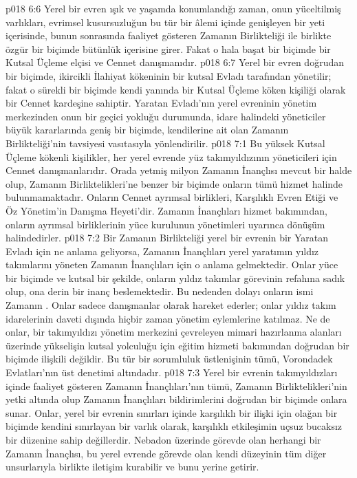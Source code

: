\vs p018 6:6 Yerel bir evren ışık ve yaşamda konumlandığı zaman, onun yüceltilmiş varlıkları, evrimsel kusursuzluğun bu tür bir âlemi içinde genişleyen bir yeti içerisinde, bunun sonrasında faaliyet gösteren Zamanın Birlikteliği ile birlikte özgür bir biçimde bütünlük içerisine girer. Fakat o hala başat bir biçimde bir Kutsal Üçleme elçisi ve Cennet danışmanıdır.
\vs p018 6:7 Yerel bir evren doğrudan bir biçimde, ikircikli İlahiyat kökeninin bir kutsal Evladı tarafından yönetilir; fakat o sürekli bir biçimde kendi yanında bir Kutsal Üçleme köken kişiliği olarak bir Cennet kardeşine sahiptir. Yaratan Evladı’nın yerel evreninin yönetim merkezinden onun bir geçici yokluğu durumunda, idare halindeki yöneticiler büyük kararlarında geniş bir biçimde, kendilerine ait olan Zamanın Birlikteliği’nin tavsiyesi vasıtasıyla yönlendirilir.
\vs p018 7:1 Bu yüksek Kutsal Üçleme kökenli kişilikler, her yerel evrende yüz takımyıldızının yöneticileri için Cennet danışmanlarıdır. Orada yetmiş milyon Zamanın İnançlısı mevcut bir halde olup, Zamanın Birliktelikleri’ne benzer bir biçimde onların tümü hizmet halinde bulunmamaktadır. Onların Cennet ayrımsal birlikleri, Karşılıklı Evren Etiği ve Öz Yönetim’in Danışma Heyeti’dir. Zamanın İnançlıları hizmet bakımından, onların ayrımsal birliklerinin yüce kurulunun yönetimleri uyarınca dönüşüm halindedirler.
\vs p018 7:2 Bir Zamanın Birlikteliği yerel bir evrenin bir Yaratan Evladı için ne anlama geliyorsa, Zamanın İnançlıları yerel yaratımın yıldız takımlarını yöneten Zamanın İnançlıları için o anlama gelmektedir. Onlar yüce bir biçimde ve kutsal bir şekilde, onların yıldız takımlar görevinin refahına sadık olup, ona derin bir inanç beslemektedir. Bu nedenden dolayı onların ismi Zamanın . Onlar sadece danışmanlar olarak hareket ederler; onlar yıldız takım idarelerinin daveti dışında hiçbir zaman yönetim eylemlerine katılmaz. Ne de onlar, bir takımyıldızı yönetim merkezini çevreleyen mimari hazırlanma alanları üzerinde yükselişin kutsal yolculuğu için eğitim hizmeti bakımından doğrudan bir biçimde ilişkili değildir. Bu tür bir sorumluluk üstlenişinin tümü, Vorondadek Evlatları’nın üst denetimi altındadır.
\vs p018 7:3 Yerel bir evrenin takımyıldızları içinde faaliyet gösteren Zamanın İnançlıları’nın tümü, Zamanın Birliktelikleri’nin yetki altında olup Zamanın İnançlıları bildirimlerini doğrudan bir biçimde onlara sunar. Onlar, yerel bir evrenin sınırları içinde karşılıklı bir ilişki için olağan bir biçimde kendini sınırlayan bir varlık olarak, karşılıklı etkileşimin uçsuz bucaksız bir düzenine sahip değillerdir. Nebadon üzerinde görevde olan herhangi bir Zamanın İnançlısı, bu yerel evrende görevde olan kendi düzeyinin tüm diğer unsurlarıyla birlikte iletişim kurabilir ve bunu yerine getirir.
